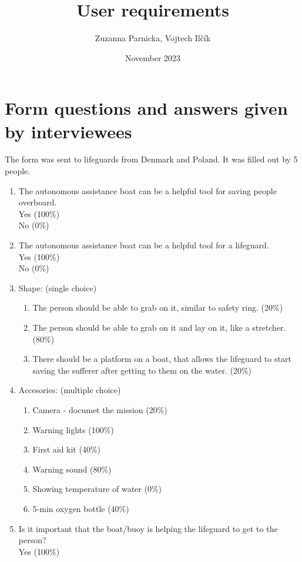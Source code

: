 \documentclass{article}[10pt]
\title{User requirements}
\author{Zuzanna Parnicka, Vojtech Il\v{c}\'{i}k}
\date{November 2023}
\begin{document}
\maketitle

\section*{Form questions and answers given by interviewees}
The form was sent to lifeguards from Denmark and Poland. It was filled out by 5 people.
\begin{enumerate}
    \item The autonomous assistance boat can be a helpful tool for saving people overboard.\\
            Yes (100\%)\\
            No (0\%)
    \item The autonomous assistance boat can be a helpful tool for a lifeguard.\\
        Yes (100\%)\\
        No (0\%)
    \item Shape: (single choice)
    \begin{enumerate}
        \item  The person should be able to grab on it, similar to safety ring. (20\%)
        \item  The person should be able to grab on it and lay on it, like a stretcher. (80\%)
        \item  There should be a platform on a boat, that allows the lifeguard to start saving the sufferer after getting to them on the water. (20\%)
    \end{enumerate}
    \item Accesories: (multiple choice)
    \begin{enumerate}
        \item Camera - documet the mission (20\%)
        \item Warning lights (100\%)
        \item First aid kit (40\%)
        \item Warning sound (80\%)
        \item Showing temperature of water (0\%)
        \item 5-min oxygen bottle (40\%)
    \end{enumerate}
    \item Is it important that the boat/buoy is helping the lifeguard to get to the person?\\
                Yes (100\%)\\

\end{enumerate}
\end{document}
